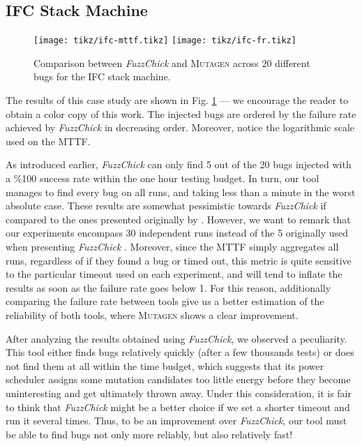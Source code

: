 \documentclass[acmsmall, anonymous]{acmart}
\newcommand{\fuzzchick}{\textit{FuzzChick}\xspace}
\newcommand{\mutagen}{\textsc{Mutagen}\xspace}
\begin{document}
\subsection{IFC Stack Machine}

\begin{figure}[t]
  \centering
  \texttt{[image: tikz/ifc-mttf.tikz]}
  \texttt{[image: tikz/ifc-fr.tikz]}
  \vspace{-20pt}
  \caption{\label{fig:results:ifc} Comparison between \fuzzchick and \mutagen
    across 20 different bugs for the IFC stack machine. }
\vspace{-10pt}
\end{figure}


The results of this case study are shown in Fig. \ref{fig:results:ifc} --- we
encourage the reader to obtain a color copy of this work.
%
The injected bugs are ordered by the failure rate achieved by \fuzzchick in
decreasing order.
%
Moreover, notice the logarithmic scale used on the MTTF.

As introduced earlier, \fuzzchick can only find 5 out of the 20 bugs injected
with a \%100 success rate within the one hour testing budget.
%
In turn, our tool manages to find every bug on all runs, and taking less than a
minute in the worst absolute case.
%
These results are somewhat pessimistic towards \fuzzchick if compared to the
ones presented originally by \citeauthor{lampropoulos2019coverage}.
%
However, we want to remark that our experiments encompass 30 independent runs
instead of the 5 originally used when presenting \fuzzchick
\citeyearpar{lampropoulos2019coverage}.
%
Moreover, since the MTTF simply aggregates all runs, regardless of if they found
a bug or timed out, this metric is quite sensitive to the particular timeout
used on each experiment, and will tend to inflate the results as soon as the
failure rate goes below 1.
%
For this reason, additionally comparing the failure rate between tools give us a
better estimation of the reliability of both tools, where \mutagen shows a clear
improvement.

After analyzing the results obtained using \fuzzchick, we observed a
peculiarity.
%
This tool either finds bugs relatively quickly (after a few thousands tests) or
does not find them at all within the time budget, which suggests that its power
scheduler assigns some mutation candidates too little energy before they become
uninteresting and get ultimately thrown away.
%
Under this consideration, it is fair to think that \fuzzchick might be a better
choice if we set a shorter timeout and run it several times.
%
Thus, to be an improvement over \fuzzchick, our tool must be able to find bugs
not only more reliably, but also relatively fast!
\end{document}

